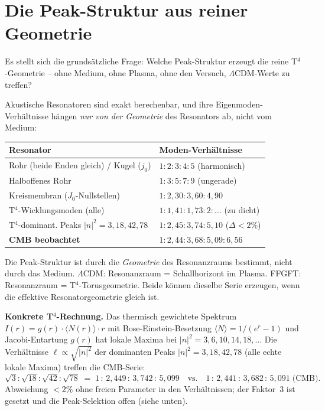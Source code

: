 \section{Die Peak-Struktur aus reiner Geometrie}

Es stellt sich die grundsätzliche Frage: Welche Peak-Struktur erzeugt die
reine T$^4$-Geometrie -- ohne Medium, ohne Plasma, ohne den Versuch,
$\Lambda$CDM-Werte zu treffen?

Akustische Resonatoren sind exakt berechenbar, und ihre Eigenmoden-Verhältnisse
hängen \emph{nur von der Geometrie} des Resonators ab, nicht vom Medium:
\begin{center}
\begin{tabular}{p{5.5cm}p{6cm}}
\toprule
\textbf{Resonator} & \textbf{Moden-Verhältnisse} \\
\midrule
Rohr (beide Enden gleich) / Kugel ($j_0$) & $1:2:3:4:5$ (harmonisch) \\
Halboffenes Rohr & $1:3:5:7:9$ (ungerade) \\
Kreismembran ($J_0$-Nullstellen) & $1:2{,}30:3{,}60:4{,}90$ \\
T$^4$-Wicklungsmoden (alle) & $1:1{,}41:1{,}73:2:\ldots$ (zu dicht) \\
T$^4$-dominant. Peaks $|n|^2=3,18,42,78$ & $1:2{,}45:3{,}74:5{,}10$ ($\Delta < 2\%$) \\
\midrule
\textbf{CMB beobachtet} & $1:2{,}44:3{,}68:5{,}09:6{,}56$ \\
\bottomrule
\end{tabular}
\end{center}

Die Peak-Struktur ist durch die \emph{Geometrie} des Resonanzraums bestimmt,
nicht durch das Medium. $\Lambda$CDM: Resonanzraum = Schallhorizont im Plasma.
FFGFT: Resonanzraum = T$^4$-Torusgeometrie. Beide können dieselbe Serie
erzeugen, wenn die effektive Resonatorgeometrie gleich ist.

\textbf{Konkrete T$^4$-Rechnung.}
Das thermisch gewichtete Spektrum $I(r) = g(r)\cdot\langle N(r)\rangle\cdot r$
mit Bose-Einstein-Besetzung $\langle N\rangle = 1/(e^r-1)$ und Jacobi-Entartung
$g(r)$ hat lokale Maxima bei $|n|^2 = 3, 6, 10, 14, 18, \ldots$ Die
Verhältnisse $\ell \propto \sqrt{|n|^2}$ der dominanten Peaks
$|n|^2 = 3, 18, 42, 78$ (alle echte lokale Maxima) treffen die CMB-Serie:
\[
  \sqrt{3}:\sqrt{18}:\sqrt{42}:\sqrt{78}
  \;=\; 1\,:\,2{,}449\,:\,3{,}742\,:\,5{,}099
  \quad\text{vs.}\quad
  1\,:\,2{,}441\,:\,3{,}682\,:\,5{,}091\;\text{(CMB)}.
\]
Abweichung $< 2\%$ ohne freien Parameter in den Verhältnissen; der Faktor~3
ist gesetzt und die Peak-Selektion offen (siehe unten).


